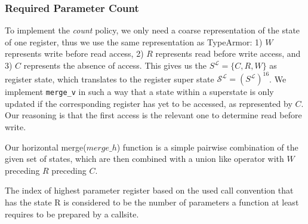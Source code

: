 \subsubsection{Required Parameter Count} 
To implement the \emph{count} policy, we only need a coarse representation of the state of one register, thus we use the same representation as TypeArmor: 1) $W$ represents write before read access, 2) $R$ represents read before write access, and 3) $C$ represents the absence of access. This gives us the $S^\mathcal{L} = \{ C, R, W \}$ as register state, which translates to the register super state $\mathcal{S}^\mathcal{L} = (S^\mathcal{L})^{16}$. We implement \texttt{merge\_v} in such a way that a state within a superstate is only updated if the corresponding register has yet to be accessed, as represented by $C$. Our reasoning is that the first access is the relevant one to determine read before write.

Our horizontal merge($merge\_h$) function is a simple pairwise combination of the given set of states, which are then combined with a union like operator with $W$ preceding $R$ preceding $C$.


The index of highest parameter register based on the used call convention that has the state R is considered to be the number of parameters a function at least requires to be prepared by a callsite.

%
%
%
%

